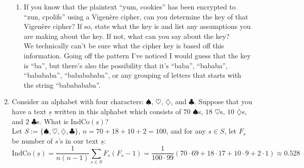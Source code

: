 \documentclass[12pt]{article}
\newcommand{\n}{\vspace{0.5cm}}
\begin{document}
\begin{enumerate}
\begin{enumerate}
      \item If you know that the plaintext ``yum, cookies'' has been encrypted to ``zun, cpolifs'' using a Vigen\`{e}re cipher, can you determine the key of that Vigen\`{e}re cipher? If so, state what the key is and list any assumptions you are making about the key. If not, what can you say about the key? \n\\
        We technically can't be sure what the cipher key is based off this information.  Going off the pattern I've noticed I would guess that the key is ``ba'', but there's also the possibility that it's ``baba'', ``bababa'', ``babababa'', ``bababababa'', or any grouping of letters that starts with the string ``bababababa''. \n
    \end{enumerate}

    \newpage
  \item Consider an alphabet with four characters: \(\spadesuit\), \(\heartsuit\), \(\diamondsuit\), and \(\clubsuit\).  Suppose that you have a text \(\underline{s}\) written in this alphabet which consists of \(70\) \(\spadesuit\)s,  \(18\) \(\heartsuit\)s, \(10\) \(\diamondsuit\)s, and \(2\) \(\clubsuit\)s.  What is \(\textrm{IndCo}(\underline{s})\)? \n\\
    Let \(S := \{\spadesuit, \heartsuit, \diamondsuit, \clubsuit\}\), \(n = 70 + 18 + 10 + 2 = 100\), and for any \(s \in S\), let \(F_{s}\) be number of \(s\)'s in our text \(\underline{s}\):
    \[\textrm{IndCo}(\underline{s}) = \frac{1}{n(n-1)} \sum_{s \in S} F_s (F_s-1) = \frac{1}{100 \cdot 99}(70 \cdot 69 + 18 \cdot 17 + 10 \cdot 9 + 2 \cdot 1) \approx 0.528\]


\end{enumerate}
\end{document}
